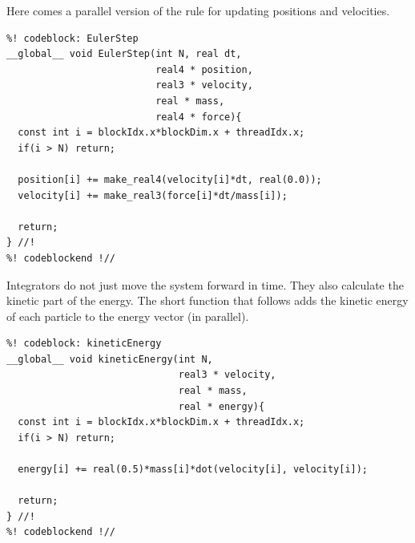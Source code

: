 Here comes a parallel version of the rule for updating positions and velocities.
\begin{lstlisting}
%! codeblock: EulerStep
__global__ void EulerStep(int N, real dt,
                          real4 * position,
                          real3 * velocity,
                          real * mass,
                          real4 * force){
  const int i = blockIdx.x*blockDim.x + threadIdx.x;
  if(i > N) return;

  position[i] += make_real4(velocity[i]*dt, real(0.0));
  velocity[i] += make_real3(force[i]*dt/mass[i]);

  return;
} //!
%! codeblockend !//
\end{lstlisting}
Integrators do not just move the system forward in time. They also calculate the 
kinetic part of the energy. The short function that follows adds the kinetic 
energy of each particle to the energy vector (in parallel).
\begin{lstlisting}
%! codeblock: kineticEnergy
__global__ void kineticEnergy(int N,
                              real3 * velocity,
                              real * mass,
                              real * energy){
  const int i = blockIdx.x*blockDim.x + threadIdx.x;
  if(i > N) return;

  energy[i] += real(0.5)*mass[i]*dot(velocity[i], velocity[i]);

  return;
} //!
%! codeblockend !//
\end{lstlisting}

